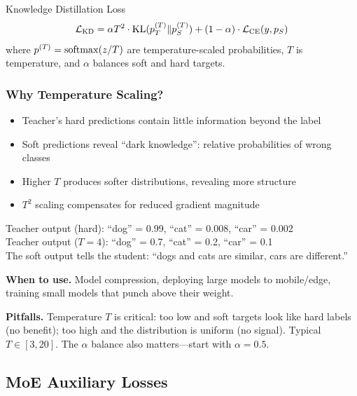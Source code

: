 \begin{mathresult}{Knowledge Distillation Loss}
\begin{equation}
\mathcal{L}_{\text{KD}} = \alpha T^2 \cdot \operatorname{KL}(p_T^{(T)} \| p_S^{(T)}) + (1-\alpha) \cdot \mathcal{L}_{\text{CE}}(y, p_S)
\end{equation}
where $p^{(T)} = \operatorname{softmax}(z/T)$ are temperature-scaled probabilities, $T$ is temperature, and $\alpha$ balances soft and hard targets.
\end{mathresult}

\subsubsection{Why Temperature Scaling?}

\begin{itemize}
    \item Teacher's hard predictions contain little information beyond the label
    \item Soft predictions reveal ``dark knowledge'': relative probabilities of wrong classes
    \item Higher $T$ produces softer distributions, revealing more structure
    \item $T^2$ scaling compensates for reduced gradient magnitude
\end{itemize}

\begin{example}
Teacher output (hard): ``dog'' = 0.99, ``cat'' = 0.008, ``car'' = 0.002\\
Teacher output ($T=4$): ``dog'' = 0.7, ``cat'' = 0.2, ``car'' = 0.1\\

The soft output tells the student: ``dogs and cats are similar, cars are different.''
\end{example}

\textbf{When to use.} Model compression, deploying large models to mobile/edge, training small models that punch above their weight.

\textbf{Pitfalls.} Temperature $T$ is critical: too low and soft targets look like hard labels (no benefit); too high and the distribution is uniform (no signal). Typical $T \in [3, 20]$. The $\alpha$ balance also matters---start with $\alpha = 0.5$.

\subsection{MoE Auxiliary Losses}
\label{sec:moe_aux_losses}

